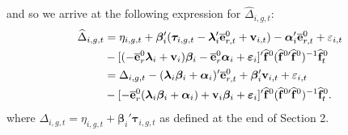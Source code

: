 \documentclass[12pt,fleqn]{article}
\def\*#1{\mathbf{#1}}
\def\+#1{\boldsymbol{#1}}
\begin{document}
and so we arrive at the following expression for $\widehat \Delta_{i,g,t}$:
\begin{align}
\widehat \Delta_{i,g,t} & = \eta_{i,g,t} + \+\beta_i'(\+\tau_{i,g,t}  - \+\lambda_i'\overline{\*e}_{r,t}^0  + \*v_{i,t}) - \+\alpha_i'\overline{\*e}_{r,t}^0 + \varepsilon_{i,t}\notag\\
& - [ (- \overline{\*e}_{r}^0\+\lambda_i  + \*v_i)\+\beta_i  - \overline{\*e}_{r}^0\+\alpha_i +  \+\varepsilon_{i} ]' \widehat{\*f}^{0} (\widehat{\*f}^{0\prime}\widehat{\*f}^0)^{-1}\widehat{\*f}_t^0 \notag\\
& = \Delta_{i,g,t} - (\+\lambda_i\+\beta_i + \+\alpha_i)'\overline{\*e}_{r,t}^0 + \+\beta_i'\*v_{i,t} + \varepsilon_{i,t} \notag\\
& - [ - \overline{\*e}_{r}^0(\+\lambda_i\+\beta_i +\+\alpha_i) + \*v_i\+\beta_i+  \+\varepsilon_{i} ]' \widehat{\*f}^{0} (\widehat{\*f}^{0\prime}\widehat{\*f}^0)^{-1}\widehat{\*f}_t^0  .
\end{align}
where $\Delta_{i,g,t} = \eta_{i,g,t} + \+\beta_i'\+\tau_{i,g,t}$ as defined at the end of Section 2.
\end{document}
